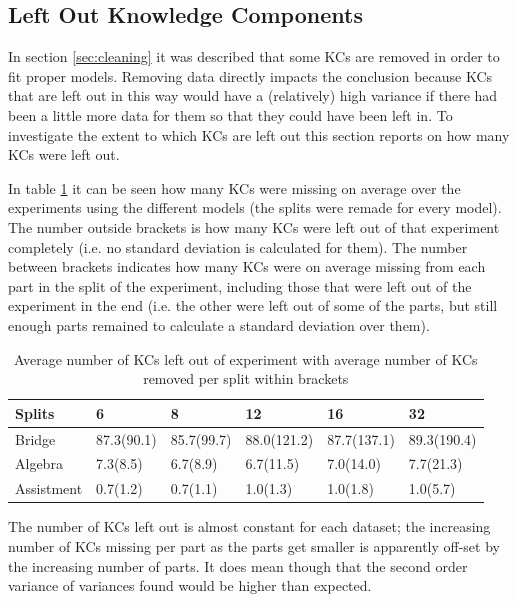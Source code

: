 \documentclass{scrartcl}
\begin{document}
\subsection{Left Out Knowledge Components}
In section \ref{sec:cleaning} it was described that some KCs are removed in order to fit proper models. Removing data directly impacts the conclusion because KCs that are left out in this way would have a (relatively) high variance if there had been a little more data for them so that they could have been left in. To investigate the extent to which KCs are left out this section reports on how many KCs were left out.   

In table \ref{tab:kcmis} it can be seen how many KCs were missing on average over the experiments using the different models (the splits were remade for every model). The number outside brackets is how many KCs were left out of that experiment completely (i.e. no standard deviation is calculated for them). The number between brackets indicates how many KCs were on average missing from each part in the split of the experiment, including those that were left out of the experiment in the end (i.e. the other were left out of some of the parts, but still enough parts remained to calculate a standard deviation over them). 

\begin{center}
\begin{table}[h]
\begin{tabular}{| l | l|l|l|l|l|}

    \hline
    Splits & 6  & 8 & 12 & 16 & 32 \\ \hline
    Bridge &  87.3(90.1)& 85.7(99.7)& 88.0(121.2)& 87.7(137.1)& 89.3(190.4) \\ \hline
    Algebra & 7.3(8.5)& 6.7(8.9)& 6.7(11.5)& 7.0(14.0)& 7.7(21.3) \\ \hline
    Assistment & 0.7(1.2)& 0.7(1.1)& 1.0(1.3)& 1.0(1.8)& 1.0(5.7) \\ \hline

\end{tabular}
\caption{Average number of KCs left out of experiment with average number of KCs removed per split within brackets}
\label{tab:kcmis}
\end{table}
\end{center}

The number of KCs left out is almost constant for each dataset; the increasing number of KCs missing per part as the parts get smaller is apparently off-set by the increasing number of parts. It does mean though that the second order variance of variances found would be higher than expected.
\end{document}
